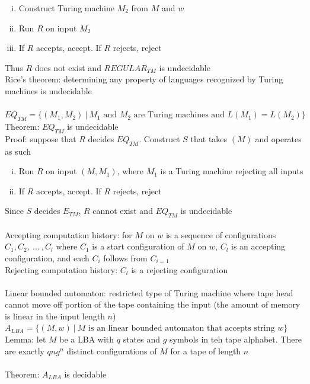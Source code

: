 \documentclass{article}
\newcommand*{\<}{\langle}
\renewcommand*{\>}{\rangle}
\begin{document}
			\begin{enumerate}[(i)]
				\item Construct Turing machine $M_2$ from $M$ and $w$
				\item Run $R$ on input $M_2$
				\item If $R$ accepts, accept. If $R$ rejects, reject
				\end{enumerate}
			Thus $R$ does not exist and $REGULAR_{TM}$ is undecidable \\
			Rice's theorem: determining any property of languages recognized by Turing machines is undecidable \\
			\\
			$EQ_{TM} = \{(M_1, M_2)\:|\:M_1\text{ and }M_2\text{ are Turing machines and }L(M_1) = L(M_2)\}$ \\
			Theorem: $EQ_{TM}$ is undecidable \\
			Proof: suppose that $R$ decides $EQ_{TM}$. Construct $S$ that takes $(M)$ and operates as such
			\begin{enumerate}[(i)]
				\item Run $R$ on input $(M, M_1)$, where $M_1$ is a Turing machine rejecting all inputs
				\item If $R$ accepts, accept. If $R$ rejects, reject
				\end{enumerate}
			Since $S$ decides $E_{TM}$, $R$ cannot exist and $EQ_{TM}$ is undecidable \\
			\\
			Accepting computation history: for $M$ on $w$ is a sequence of configurations $C_1, C_2,\:...\:, C_l$ where $C_1$ is a start configuration of $M$ on $w$, $C_l$ is an accepting configuration, and each $C_i$ follows from $C_{i = 1}$ \\
			Rejecting computation history: $C_l$ is a rejecting configuration \\
			\\
			Linear bounded automaton: restricted type of Turing machine where tape head cannot move off portion of the tape containing the input (the amount of memory is linear in the input length $n$) \\
			$A_{LBA} = \{(M, w)\:|\:M\text{ is an linear bounded automaton that accepts string }w\}$ \\
			Lemma: let $M$ be a LBA with $q$ states and $g$ symbols in teh tape alphabet. There are exactly $qng^n$ distinct configurations of $M$ for a tape of length $n$ \\
			\\
			Theorem: $A_{LBA}$ is decidable \\
\end{document}
